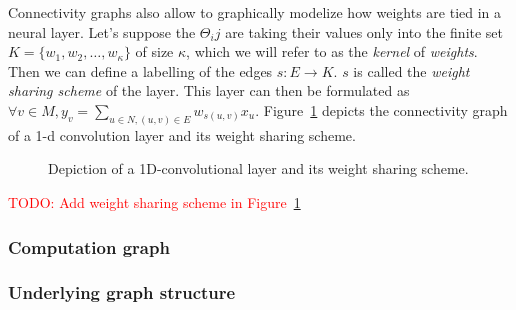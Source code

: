 \documentclass{article}
\theoremstyle{definition}
\newcommand{\todo}[1]{\textcolor{red}{TODO: #1}}
\begin{document}
Connectivity graphs also allow to graphically modelize how weights are tied in a neural layer. Let's suppose the $\Theta_ij$ are taking their values only into the finite set $K = \{w_1, w_2, \ldots, w_\kappa\}$ of size $\kappa$, which we will refer to as the \emph{kernel} of \emph{weights}. Then we can define a labelling of the edges $s: E \rightarrow K$. $s$ is called the \emph{weight sharing scheme} of the layer. This layer can then be formulated as $\displaystyle \forall v \in M, y_v = \sum_{u \in N, (u,v) \in E} w_{s(u,v)} x_u$. Figure~\ref{cnn} depicts the connectivity graph of a 1-d convolution layer and its weight sharing scheme.

\begin{figure}[h]
  \begin{center}
  \end{center}
  \caption{Depiction of a 1D-convolutional layer and its weight sharing scheme.}
  \label{cnn}
\end{figure}


\todo{Add weight sharing scheme in Figure~\ref{cnn}}

\subsubsection{Computation graph}
\label{comp_graph}

\subsubsection{Underlying graph structure}
\label{inductive_graph}
\end{document}
